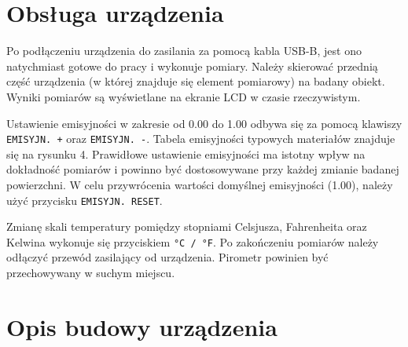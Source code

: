 \newpage

\section{Obsługa urządzenia}
Po podłączeniu urządzenia do zasilania za pomocą kabla USB-B, jest ono natychmiast gotowe do pracy i wykonuje pomiary. Należy skierować przednią część urządzenia (w której znajduje się element pomiarowy) na badany obiekt. Wyniki pomiarów są wyświetlane na ekranie LCD w czasie rzeczywistym.

\vspace{12pt}

Ustawienie emisyjności w zakresie od 0.00 do 1.00 odbywa się za pomocą klawiszy \texttt{EMISYJN. +} oraz \texttt{EMISYJN. -}. Tabela emisyjności typowych materiałów znajduje się na rysunku 4. Prawidłowe ustawienie emisyjności ma istotny wpływ na dokładność pomiarów i powinno być dostosowywane przy każdej zmianie badanej powierzchni. W celu przywrócenia wartości domyślnej emisyjności (1.00), należy użyć przycisku \texttt{EMISYJN. RESET}.

\vspace{12pt}

Zmianę skali temperatury pomiędzy stopniami Celsjusza, Fahrenheita oraz Kelwina wykonuje się przyciskiem \texttt{°C / °F}. Po zakończeniu pomiarów należy odłączyć przewód zasilający od urządzenia. Pirometr powinien być przechowywany w suchym miejscu.

\section{Opis budowy urządzenia}


